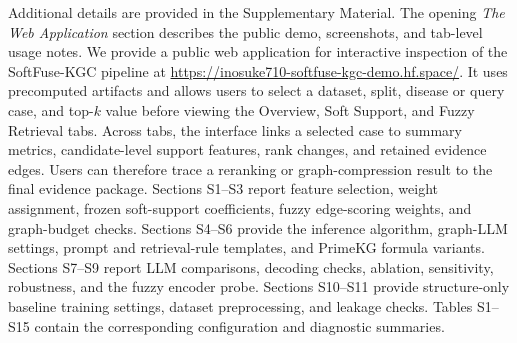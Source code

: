 \documentclass[pdflatex,sn-mathphys-num]{sn-jnl}
\newcommand{\softfuse}{SoftFuse-KGC}
\begin{document}

Additional details are provided in the Supplementary Material. The opening \textit{The Web Application} section describes the public demo, screenshots, and tab-level usage notes. We provide a public web application for interactive inspection of the \softfuse{} pipeline at \url{https://inosuke710-softfuse-kgc-demo.hf.space/}. It uses precomputed artifacts and allows users to select a dataset, split, disease or query case, and top-\(k\) value before viewing the Overview, Soft Support, and Fuzzy Retrieval tabs. Across tabs, the interface links a selected case to summary metrics, candidate-level support features, rank changes, and retained evidence edges. Users can therefore trace a reranking or graph-compression result to the final evidence package. Sections S1--S3 report feature selection, weight assignment, frozen soft-support coefficients, fuzzy edge-scoring weights, and graph-budget checks. Sections S4--S6 provide the inference algorithm, graph-LLM settings, prompt and retrieval-rule templates, and PrimeKG formula variants. Sections S7--S9 report LLM comparisons, decoding checks, ablation, sensitivity, robustness, and the fuzzy encoder probe. Sections S10--S11 provide structure-only baseline training settings, dataset preprocessing, and leakage checks.  Tables S1--S15 contain the corresponding configuration and diagnostic summaries. 



\end{document}
